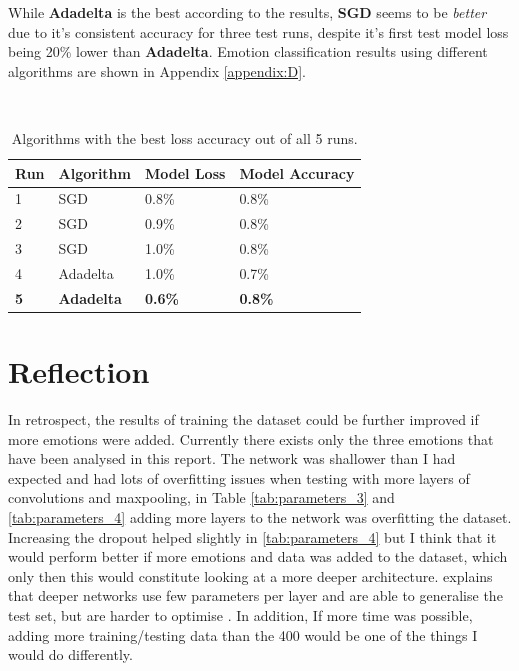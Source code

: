 \documentclass[report, 11pt, oneside]{dissertation}
\begin{document}
While \textbf{Adadelta} is the best according to the results, \textbf{SGD} seems to be \textit{better} due to it's consistent accuracy for three test runs, despite it's first test model loss being 20\% lower than \textbf{Adadelta}. Emotion classification results using different algorithms are shown in Appendix \ref{appendix:D}.

\ \ \ \ \ \ 

\begin{table}[H]
\centering
\begin{tabular}{|l|l|l|l|}
\hline
Run        & Algorithm         & Model Loss     & Model Accuracy \\ \hline
1          & SGD               & 0.8\%          & 0.8\%          \\ \hline
2          & SGD               & 0.9\%          & 0.8\%          \\ \hline
3          & SGD               & 1.0\%          & 0.8\%          \\ \hline
4          & Adadelta          & 1.0\%          & 0.7\%          \\ \hline
\textbf{5} & \textbf{Adadelta} & \textbf{0.6\%} & \textbf{0.8\%} \\ \hline
\end{tabular}
\caption{Algorithms with the best loss accuracy out of all 5 runs.}
\label{tab:best_of_5_results}
\end{table}



\chapter{Reflection} \label{chap:reflection}

In retrospect, the results of training the dataset could be further improved if more emotions were added. Currently there exists only the three emotions that have been analysed in this report. The network was  shallower than I had expected and had lots of overfitting issues when testing with more layers of convolutions and maxpooling, in Table \ref{tab:parameters_3} and \ref{tab:parameters_4} adding more layers to the network was overfitting the dataset. Increasing the dropout helped slightly in \ref{tab:parameters_4} but I think that it would perform better if more emotions and data was added to the dataset, which only then this would constitute looking at a more deeper architecture. \citeauthor{Goodfellow-et-al-2016} explains that deeper networks use few parameters per layer and are able to generalise the test set, but are harder to optimise \citeyearpar[192]{Goodfellow-et-al-2016}. In addition, If more time was possible, adding more training/testing data than the 400 would be one of the things I would do differently.
\end{document}

